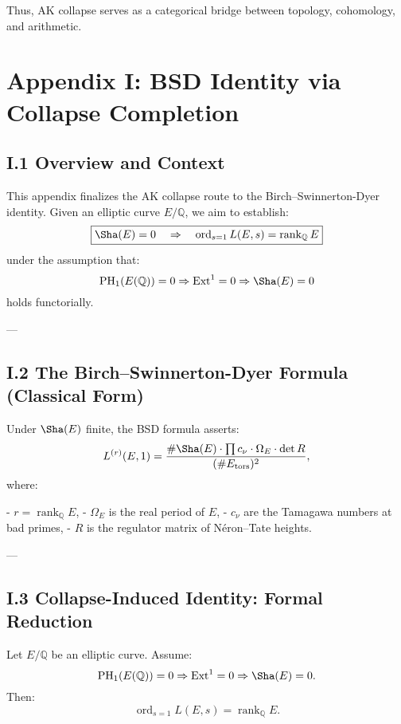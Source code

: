 Thus, AK collapse serves as a categorical bridge between topology, cohomology, and arithmetic.





\section*{Appendix I: BSD Identity via Collapse Completion}

\subsection*{I.1 Overview and Context}

This appendix finalizes the AK collapse route to the Birch–Swinnerton-Dyer identity.  
Given an elliptic curve \( E/\mathbb{Q} \), we aim to establish:
\[
\boxed{\Sha(E) = 0 \quad \Rightarrow \quad \operatorname{ord}_{s=1} L(E,s) = \operatorname{rank}_{\mathbb{Q}} E}
\]
under the assumption that:
\[
\mathrm{PH}_1(E(\mathbb{Q})) = 0 \Rightarrow \mathrm{Ext}^1 = 0 \Rightarrow \Sha(E) = 0
\]
holds functorially.

---

\subsection*{I.2 The Birch–Swinnerton-Dyer Formula (Classical Form)}

Under \( \Sha(E) \) finite, the BSD formula asserts:
\[
L^{(r)}(E, 1) = \frac{\#\Sha(E) \cdot \prod c_\nu \cdot \Omega_E \cdot \det R}{(\# E_{\text{tors}})^2},
\]
where:

- \( r = \operatorname{rank}_{\mathbb{Q}} E \),
- \( \Omega_E \) is the real period of \( E \),
- \( c_\nu \) are the Tamagawa numbers at bad primes,
- \( R \) is the regulator matrix of Néron–Tate heights.

---

\subsection*{I.3 Collapse-Induced Identity: Formal Reduction}

\begin{theorem}
Let \( E/\mathbb{Q} \) be an elliptic curve.  
Assume:
\[
\mathrm{PH}_1(E(\mathbb{Q})) = 0 \Rightarrow \mathrm{Ext}^1 = 0 \Rightarrow \Sha(E) = 0.
\]
Then:
\[
\operatorname{ord}_{s=1} L(E,s) = \operatorname{rank}_{\mathbb{Q}} E.
\]
\end{theorem}

